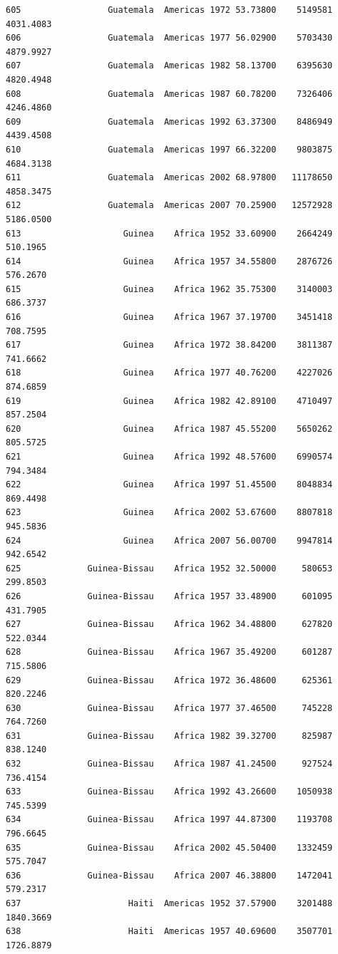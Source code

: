 \documentclass[
  letterpaper,
  DIV=11,
  numbers=noendperiod]{scrreprt}
\begin{document}
\begin{verbatim}
605                 Guatemala  Americas 1972 53.73800    5149581   4031.4083
606                 Guatemala  Americas 1977 56.02900    5703430   4879.9927
607                 Guatemala  Americas 1982 58.13700    6395630   4820.4948
608                 Guatemala  Americas 1987 60.78200    7326406   4246.4860
609                 Guatemala  Americas 1992 63.37300    8486949   4439.4508
610                 Guatemala  Americas 1997 66.32200    9803875   4684.3138
611                 Guatemala  Americas 2002 68.97800   11178650   4858.3475
612                 Guatemala  Americas 2007 70.25900   12572928   5186.0500
613                    Guinea    Africa 1952 33.60900    2664249    510.1965
614                    Guinea    Africa 1957 34.55800    2876726    576.2670
615                    Guinea    Africa 1962 35.75300    3140003    686.3737
616                    Guinea    Africa 1967 37.19700    3451418    708.7595
617                    Guinea    Africa 1972 38.84200    3811387    741.6662
618                    Guinea    Africa 1977 40.76200    4227026    874.6859
619                    Guinea    Africa 1982 42.89100    4710497    857.2504
620                    Guinea    Africa 1987 45.55200    5650262    805.5725
621                    Guinea    Africa 1992 48.57600    6990574    794.3484
622                    Guinea    Africa 1997 51.45500    8048834    869.4498
623                    Guinea    Africa 2002 53.67600    8807818    945.5836
624                    Guinea    Africa 2007 56.00700    9947814    942.6542
625             Guinea-Bissau    Africa 1952 32.50000     580653    299.8503
626             Guinea-Bissau    Africa 1957 33.48900     601095    431.7905
627             Guinea-Bissau    Africa 1962 34.48800     627820    522.0344
628             Guinea-Bissau    Africa 1967 35.49200     601287    715.5806
629             Guinea-Bissau    Africa 1972 36.48600     625361    820.2246
630             Guinea-Bissau    Africa 1977 37.46500     745228    764.7260
631             Guinea-Bissau    Africa 1982 39.32700     825987    838.1240
632             Guinea-Bissau    Africa 1987 41.24500     927524    736.4154
633             Guinea-Bissau    Africa 1992 43.26600    1050938    745.5399
634             Guinea-Bissau    Africa 1997 44.87300    1193708    796.6645
635             Guinea-Bissau    Africa 2002 45.50400    1332459    575.7047
636             Guinea-Bissau    Africa 2007 46.38800    1472041    579.2317
637                     Haiti  Americas 1952 37.57900    3201488   1840.3669
638                     Haiti  Americas 1957 40.69600    3507701   1726.8879

\end{verbatim}
\end{document}
